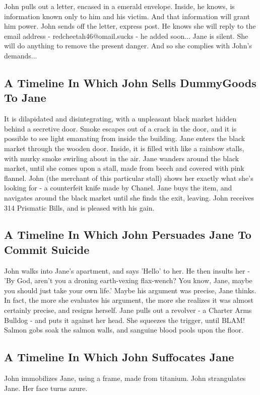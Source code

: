 \documentclass{article}
\begin{document}
John pulls out a letter, encased in a emerald envelope. Inside, he knows, is information known only to him and his victim. And that information will grant him power.
John sends off the letter, express post. He knows she will reply to the email address {-} redcheetah46@omail.sucks {-} he added soon...
Jane is silent. She will do anything to remove the present danger. And so she complies with John's demands...
\subsection{A Timeline In Which John Sells DummyGoods To Jane}


It is dilapidated and disintegrating, with a unpleasant black market hidden behind a secretive door.
Smoke escapes out of a crack in the door, and it is possible to see light emanating from inside the building.
Jane enters the black market through the wooden door.
Inside, it is filled with like a rainbow stalls, with murky smoke swirling about in the air.
Jane wanders around the black market, until she comes upon a stall, made from beech and covered with pink flannel.
John (the merchant of this particular stall) shows her exactly what she's looking for {-} a counterfeit knife made by Chanel.
Jane buys the item, and navigates around the black market until she finds the exit, leaving.
John receives 314 Prismatic Bills, and is pleased with his gain.
\subsection{A Timeline In Which John Persuades Jane To Commit Suicide}


John walks into Jane's apartment, and says 'Hello' to her.
He then insults her {-} 'By God, aren't you a droning earth{-}vexing flax{-}wench?
You know, Jane, maybe you should just take your own life.'
Maybe his argument was precise, Jane thinks.
In fact, the more she evaluates his argument, the more she realizes it was almost certainly precise, and resigns herself.
Jane pulls out a revolver {-} a Charter Arms Bulldog {-} and puts it against her head.
She squeezes the trigger, until BLAM!
Salmon gobs soak the salmon walls, and sanguine blood pools upon the floor.
\subsection{A Timeline In Which John Suffocates Jane}


John immobilizes Jane, using a frame, made from titanium.
John strangulates Jane.
Her face turns azure.
\end{document}
